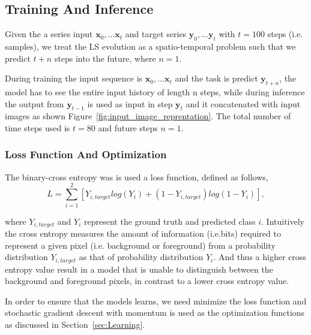 \documentclass{WitsPhysicsReport}
\begin{document}
\subsection{Training And Inference}

Given the a series input ${\mathbf{x}_{0}, ...\mathbf{x}_{t}}$ and target series ${\mathbf{y}_{0}, ...\mathbf{y}_{t}}$ with $t=100$ steps (i.e. samples), we treat the LS evolution as a spatio-temporal problem such that we predict $t+n$ steps into the future, where $n=1$. 

During training the input sequence is ${\mathbf{x}_{0}, ...\mathbf{x}_{t}}$ and the task is predict ${\mathbf{y}_{t+n}}$, the model has to see the entire input history of length n steps, while during inference the output from ${\mathbf{y}_{t-1}}$ is used as input in step ${\mathbf{y}_{t}}$ and it  concatenated with input images as shown
Figure~\ref{fig:input_image_reprentation}. The total number of time steps used is $t=80$ and future steps $n=1$. 


\subsubsection{Loss Function And Optimization}
\label{sec:loss_function}

The binary-cross entropy was is used a loss function, defined as follows,
\begin{equation}
    L = \sum_{i=1}^{2} [Y_{i,target} log(Y_{i}) + (1 - Y_{i,target}) log(1 - Y_{i})],
\end{equation}


where $Y_{i,target}$ and $Y_{i}$ represent the ground truth and predicted class $i$. Intuitively the cross entropy measures the amount of information (i.e.bits) required to represent a given pixel (i.e. background or foreground) from a probability distribution $Y_{i,target}$  as that of probability distribution $Y_{i}$.  And thus a higher cross entropy value result in a model that is unable to distinguish between the background and foreground pixels, in contrast to a lower cross entropy value.

In order to ensure that the models learns, we need minimize the loss function and stochastic gradient descent with momentum is used as the optimization functions as discussed in Section~\ref{sec:Learning}. 
\end{document}
